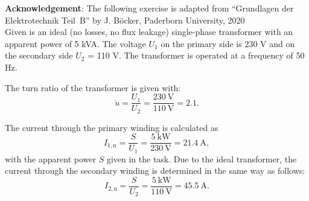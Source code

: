 
\normalsize{\textbf{Acknowledgement}: The following exercise is adapted from ``Grundlagen der Elektrotechnik Teil~B'' by J. Böcker, Paderborn University, 2020}\\



Given is an ideal (no losses, no flux leakage) single-phase transformer with an apparent power of 5 kVA. The voltage $U_{\mathrm{1}}$ on the primary side is 230 V and on the secondary side $U_{\mathrm{2}}$ = 110 V. The transformer is operated at a frequency of 50 Hz.


\begin{solutionblock}
  The turn ratio of the transformer is given with:
  \begin{equation}
    \ddot{u} = \frac{U_{\mathrm{1}}}{U_{\mathrm{2}}}
    = \frac{\SI{230}{\volt}}{\SI{110}{\volt}}
    = 2.1.
  \end{equation}


\end{solutionblock}



\begin{solutionblock}
  The current through the primary winding is calculated as
  \begin{equation}
    I_{\mathrm{1,n}} = \frac{S}{U_{\mathrm{1}}}
    = \frac{\SI{5}{\kilo \watt}}{\SI{230}{\volt}}
    = \SI{21.4}{\ampere},
  \end{equation}
  with the apparent power $S$ given in the task.
  Due to the ideal transformer, the current through the secondary winding is determined in the same way as follows: 
  \begin{equation}
    I_{\mathrm{2,n}} = \frac{S}{U_{\mathrm{2}}}
    = \frac{\SI{5}{\kilo \watt}}{\SI{110}{\volt}}
    = \SI{45.5}{\ampere}.
  \end{equation}

\end{solutionblock}


